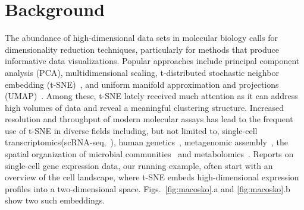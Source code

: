 \documentclass[twocolumn]{bmcart}
\begin{document}
\section*{Background}

The abundance of high-dimensional data sets in molecular biology calls for dimensionality reduction techniques, particularly for methods that produce informative data visualizations. Popular approaches include 
principal component analysis (PCA), multidimensional scaling, t-distributed stochastic neighbor embedding (t-SNE)~\cite{maaten2008visualizing}, and uniform manifold approximation and projections (UMAP)~\cite{2018arXivUMAP}. Among these, t-SNE lately received much attention as it can address high volumes of data and reveal a meaningful clustering structure. Increased
resolution and throughput of modern molecular assays has lead to the frequent use of t-SNE in diverse fields including, but not limited to, single-cell transcriptomics(scRNA-seq,~\cite{macosko2015highly,cao2019single,tasic2018shared}),
human genetics~\cite{hirata2019genetic}, metagenomic
assembly~\cite{beaulaurier2018metagenomic}, the spatial organization of microbial communities~\cite{sheth2019spatial} and metabolomics~\cite{tkachev2019differences}. Reports on single-cell gene expression data, our running example, often start with an overview of the cell landscape, where t-SNE embeds high-dimensional expression profiles into a two-dimensional
space. Figs.~\ref{fig:macosko}.a and \ref{fig:macosko}.b show two such embeddings.
\end{document}
